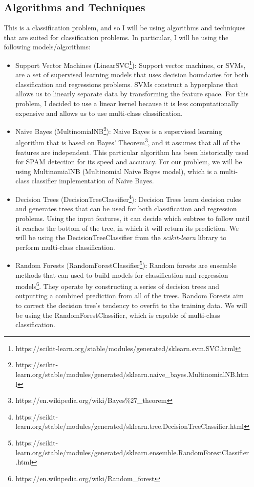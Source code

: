 \documentclass[12pt]{article}
\begin{document}
\subsection{Algorithms and Techniques}
This is a classification problem, and so I will be using algorithms and techniques that are suited for classification problems. In particular, I will be using the following models/algorithms:

\begin{itemize}
	\item Support Vector Machines (LinearSVC\footnote{https://scikit-learn.org/stable/modules/generated/sklearn.svm.SVC.html}): Support vector machines, or SVMs, are a set of supervised learning models that uses decision boundaries for both classification and regressions problems. SVMs construct a hyperplane that allows us to linearly separate data by transforming the feature space. For this problem, I decided to use a linear kernel because it is less computationally expensive and allows us to use multi-class classification.
	\item Naive Bayes (MultinomialNB\footnote{https://scikit-learn.org/stable/modules/generated/sklearn.naive\_bayes.MultinomialNB.html}): Naive Bayes is a supervised learning algorithm that is based on Bayes' Theorem\footnote{https://en.wikipedia.org/wiki/Bayes\%27\_theorem}, and it assumes that all of the features are independent. This particular algorithm has been historically used for SPAM detection for its speed and accuracy. For our problem, we will be using MultinomialNB (Multinomial Naive Bayes model), which is a multi-class classifier implementation of Naive Bayes.
	\item Decision Trees (DecisionTreeClassifier\footnote{https://scikit-learn.org/stable/modules/generated/sklearn.tree.DecisionTreeClassifier.html}): Decision Trees learn decision rules and generates trees that can be used for both classification and regression problems. Using the input features, it can decide which subtree to follow until it reaches the bottom of the tree, in which it will return its prediction. We will be using the DecisionTreeClassifier from the \textit{scikit-learn} library to perform multi-class classification.
	\item Random Forests (RandomForestClassifier\footnote{https://scikit-learn.org/stable/modules/generated/sklearn.ensemble.RandomForestClassifier.html}): Random forests are ensemble methods that can used to build models for classification and regression models\footnote{https://en.wikipedia.org/wiki/Random\_forest}. They operate by constructing a series of decision trees and outputting a combined prediction from all of the trees. Random Forests aim to correct the decision tree's tendency to overfit to the training data. We will be using the RandomForestClassifier, which is capable of multi-class classification.

\end{itemize}
\end{document}
